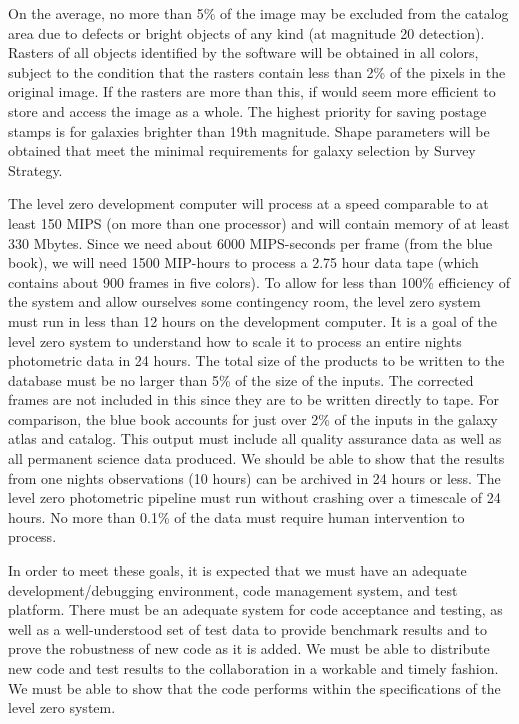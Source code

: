 On the average, no more than 5\% of the image may 
be excluded from the catalog area due to defects or bright objects of any 
kind (at magnitude 20 detection).  Rasters of all objects identified by 
the software will be obtained in all colors, subject to the condition that
the rasters contain less than 2\% of the pixels in the original image.  
If the rasters are more than this, if would seem more efficient to store
and access the image as a whole.  The highest priority for saving postage
stamps is for galaxies brighter than 19th magnitude.  Shape parameters will be 
obtained that meet the minimal requirements for galaxy selection by Survey 
Strategy.

	The level zero development computer will process at a speed
comparable to at least 150 MIPS (on more than one processor) and will 
contain memory of at least 330 Mbytes.  Since we need about 6000 
MIPS-seconds per frame (from the blue book), we will need 1500 MIP-hours 
to process a 2.75 hour data tape (which contains about 900 frames in 
five colors).  To allow for less than 100\% efficiency of the system 
and allow ourselves some contingency room, the level zero system must 
run in less than 12 hours on the development computer.  It is a goal of the
level zero system to understand how to scale it to process an entire nights
photometric data in 24 hours.  The total size of the products to be written 
to the database must be no larger than 5\% of the size of the inputs.  The 
corrected frames are not included in this since they are to be written 
directly to tape.  For comparison, the blue book accounts for just 
over 2\% of the inputs in the galaxy atlas and catalog.  This output must 
include all quality assurance data as well as all permanent science data 
produced.  We should be able to show that the results from one nights
observations (10 hours) can be archived in 24 hours or less.  The level 
zero photometric pipeline must run without crashing over a timescale of 
24 hours.  No more than 0.1\% of the data must require human intervention 
to process.

	In order to meet these goals, it is expected that we must have an
adequate development/debugging environment, code management system, 
and test platform.  There must be an adequate system for code acceptance 
and testing, as well as a well-understood set of test data to provide 
benchmark results and to prove the robustness of new code as it is added.  
We must be able to distribute new code and test results to the 
collaboration in a workable and timely fashion.  We must be able to
show that the code performs within the specifications of the level zero
system.



